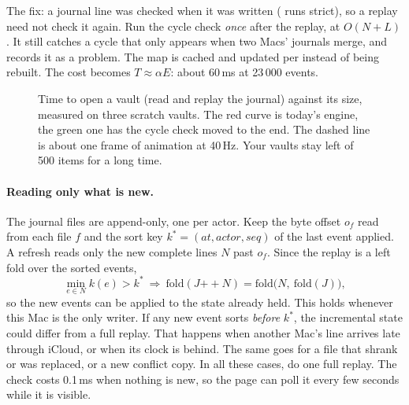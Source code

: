 The fix: a journal line was checked when it was written ( runs strict), so a replay need not check it
again. Run the cycle check \emph{once} after the replay, at $O(N + L)$. It still catches a cycle that only appears when two
Macs' journals merge, and records it as a problem. The  map is cached and updated per  instead of
being rebuilt. The cost becomes $T \approx \alpha E$: about 60\,ms at 23\,000 events.

\begin{figure}[!htbp]
\centering
{}
\caption{Time to open a vault (read and replay the journal) against its size, measured on three scratch vaults. The red
curve is today's engine, the green one has the cycle check moved to the end. The dashed line is about one frame of
animation at 40\,Hz. Your vaults stay left of 500 items for a long time.}
\label{fig:pdm10-cost}
\end{figure}

\paragraph{Reading only what is new.} The journal files are append-only, one per actor. Keep the byte offset $o_f$ read
from each file $f$ and the sort key $k^\ast = (\mathit{at}, \mathit{actor}, \mathit{seq})$ of the last event applied. A
refresh reads only the new complete lines $N$ past $o_f$. Since the replay is a left fold over the sorted events,
\[
  \min_{e \in N} k(e) > k^\ast \ \Longrightarrow\ \mathrm{fold}(J \mathbin{+\!\!+} N) = \mathrm{fold}\bigl(N,\ \mathrm{fold}(J)\bigr),
\]
so the new events can be applied to the state already held. This holds whenever this Mac is the only writer. If any new
event sorts \emph{before} $k^\ast$, the incremental state could differ from a full replay. That happens when another Mac's
line arrives late through iCloud, or when its clock is behind. The same goes for a file that shrank or was replaced, or a
new conflict copy. In all these cases, do one full replay. The check costs 0.1\,ms when nothing is new, so the page can poll
it every few seconds while it is visible.

